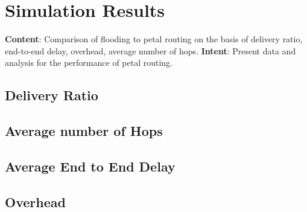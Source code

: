 \chapter{Simulation Results}
\textbf{Content}: Comparison of flooding to petal routing on the basis of delivery ratio, end-to-end delay, overhead, average number of hops. 
\textbf{Intent}:  Present data and analysis for the performance of petal routing.

\section{Delivery Ratio}
\section{Average number of Hops}
\section{Average End to End Delay}
\section{Overhead}
